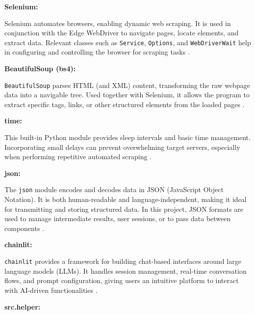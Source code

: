 \vspace{0.4cm}
\noindent\textbf{Selenium:}

\noindent
Selenium automates browsers, enabling dynamic web scraping. It is used in conjunction with the Edge WebDriver
to navigate pages, locate elements, and extract data. Relevant classes such as \texttt{Service}, \texttt{Options}, 
and \texttt{WebDriverWait} help in configuring and controlling the browser for scraping tasks \cite{pythonlibrary}.

\vspace{0.4cm}
\noindent\textbf{BeautifulSoup (bs4):}

\noindent
\texttt{BeautifulSoup} parses HTML (and XML) content, transforming the raw webpage data into a navigable tree. 
Used together with Selenium, it allows the program to extract specific tags, links, or other structured elements 
from the loaded pages \cite{pythonlibrary}.

\vspace{0.4cm}
\noindent\textbf{time:}

\noindent
This built-in Python module provides sleep intervals and basic time management. Incorporating small delays can prevent 
overwhelming target servers, especially when performing repetitive automated scraping \cite{pythonlibrary}.

\vspace{0.4cm}
\noindent\textbf{json:}

\noindent
The \texttt{json} module encodes and decodes data in JSON (JavaScript Object Notation). It is both human-readable
and language-independent, making it ideal for transmitting and storing structured data. In this project, JSON 
formats are used to manage intermediate results, user sessions, or to pass data between components \cite{pythonlibrary}.

\vspace{0.4cm}
\noindent\textbf{chainlit:}

\noindent
\texttt{chainlit} provides a framework for building chat-based interfaces around large language models (LLMs). 
It handles session management, real-time conversation flows, and prompt configuration, giving users an 
intuitive platform to interact with AI-driven functionalities \cite{pythonlibrary}.

\vspace{0.4cm}
\noindent\textbf{src.helper:}

